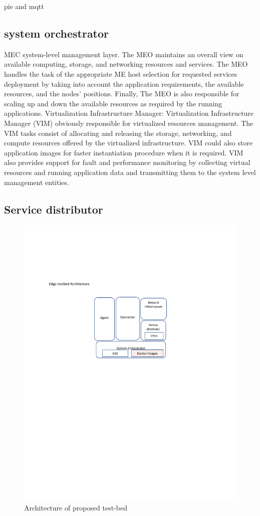 \documentclass[conference]{IEEEtran}
\begin{document}
pie and mqtt

\subsection{system orchestrator}
MEC system-level management layer.
The MEO maintains an overall view on available computing,
storage, and networking resources and services. The MEO handles
the task of the appropriate ME host selection for requested
services deployment by taking into account the application
requirements, the available resources, and the nodes' positions.
Finally, The MEO is also responsible for scaling up and down the
available resources as required by the running applications.
Virtualization Infrastructure Manager: Virtualization
Infrastructure Manager (VIM) obviously responsible for
virtualized resources management. The VIM tasks consist of
allocating and releasing the storage, networking, and compute
resources offered by the virtualized infrastructure. VIM could also
store application images for faster instantiation procedure when it
is required. VIM also provides support for fault and performance
monitoring by collecting virtual resources and running application
data and transmitting them to the system level management
entities.
\subsection{Service distributor}




\begin{figure}[htbp]
\centerline{\includegraphics{figures/Arch.pdf}}
\caption{Architecture of proposed test-bed}
\label{fig-arch}
\end{figure}
\end{document}
